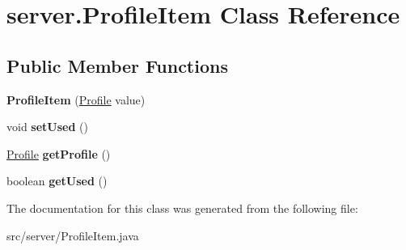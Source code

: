 \hypertarget{classserver_1_1_profile_item}{
\section{server.ProfileItem Class Reference}
\label{classserver_1_1_profile_item}
}
\subsection*{Public Member Functions}
\begin{DoxyCompactItemize}
\item 
\hypertarget{classserver_1_1_profile_item_a85fd06188a32004a2ec05c170cf54615}{
{\bfseries ProfileItem} (\hyperlink{classvideo_1_1_profile}{Profile} value)}
\label{classserver_1_1_profile_item_a85fd06188a32004a2ec05c170cf54615}

\item 
\hypertarget{classserver_1_1_profile_item_a9c501c3e5a4db919818aacb3074750d3}{
void {\bfseries setUsed} ()}
\label{classserver_1_1_profile_item_a9c501c3e5a4db919818aacb3074750d3}

\item 
\hypertarget{classserver_1_1_profile_item_a8c0499d0062d790e6e45f324aa707eaa}{
\hyperlink{classvideo_1_1_profile}{Profile} {\bfseries getProfile} ()}
\label{classserver_1_1_profile_item_a8c0499d0062d790e6e45f324aa707eaa}

\item 
\hypertarget{classserver_1_1_profile_item_a25fb41f48dcb91080e9a152d019b6367}{
boolean {\bfseries getUsed} ()}
\label{classserver_1_1_profile_item_a25fb41f48dcb91080e9a152d019b6367}

\end{DoxyCompactItemize}


The documentation for this class was generated from the following file:\begin{DoxyCompactItemize}
\item 
src/server/ProfileItem.java\end{DoxyCompactItemize}
